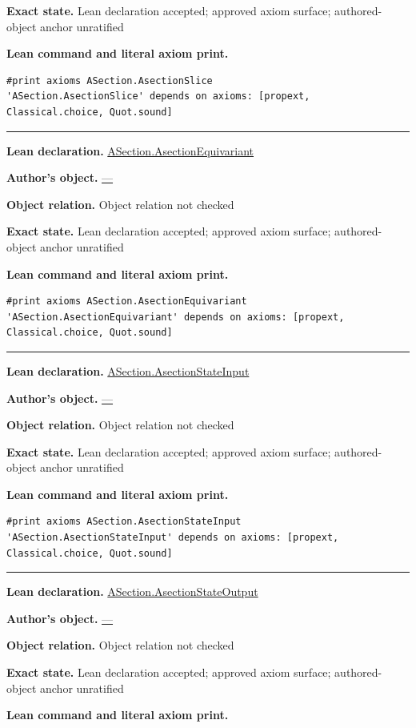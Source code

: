 \documentclass[11pt]{article}
\theoremstyle{plain}
\theoremstyle{definition}
\theoremstyle{remark}
\begin{document}
\begin{tcolorbox}
\par\textbf{Exact state.} Lean declaration accepted; approved axiom surface; authored-object anchor unratified
\par\smallskip\textbf{Lean command and literal axiom print.}
\begin{Verbatim}[breaklines=true,breakanywhere=true,fontsize=\small]
#print axioms ASection.AsectionSlice
'ASection.AsectionSlice' depends on axioms: [propext, Classical.choice, Quot.sound]
\end{Verbatim}
\medskip\hrule\medskip
\textbf{Lean declaration.} \url{ASection.AsectionEquivariant}
\par\textbf{Author's object.} \url{—}
\par\textbf{Object relation.} Object relation not checked
\par\textbf{Exact state.} Lean declaration accepted; approved axiom surface; authored-object anchor unratified
\par\smallskip\textbf{Lean command and literal axiom print.}
\begin{Verbatim}[breaklines=true,breakanywhere=true,fontsize=\small]
#print axioms ASection.AsectionEquivariant
'ASection.AsectionEquivariant' depends on axioms: [propext, Classical.choice, Quot.sound]
\end{Verbatim}
\medskip\hrule\medskip
\textbf{Lean declaration.} \url{ASection.AsectionStateInput}
\par\textbf{Author's object.} \url{—}
\par\textbf{Object relation.} Object relation not checked
\par\textbf{Exact state.} Lean declaration accepted; approved axiom surface; authored-object anchor unratified
\par\smallskip\textbf{Lean command and literal axiom print.}
\begin{Verbatim}[breaklines=true,breakanywhere=true,fontsize=\small]
#print axioms ASection.AsectionStateInput
'ASection.AsectionStateInput' depends on axioms: [propext, Classical.choice, Quot.sound]
\end{Verbatim}
\medskip\hrule\medskip
\textbf{Lean declaration.} \url{ASection.AsectionStateOutput}
\par\textbf{Author's object.} \url{—}
\par\textbf{Object relation.} Object relation not checked
\par\textbf{Exact state.} Lean declaration accepted; approved axiom surface; authored-object anchor unratified
\par\smallskip\textbf{Lean command and literal axiom print.}

\end{tcolorbox}
\end{document}
